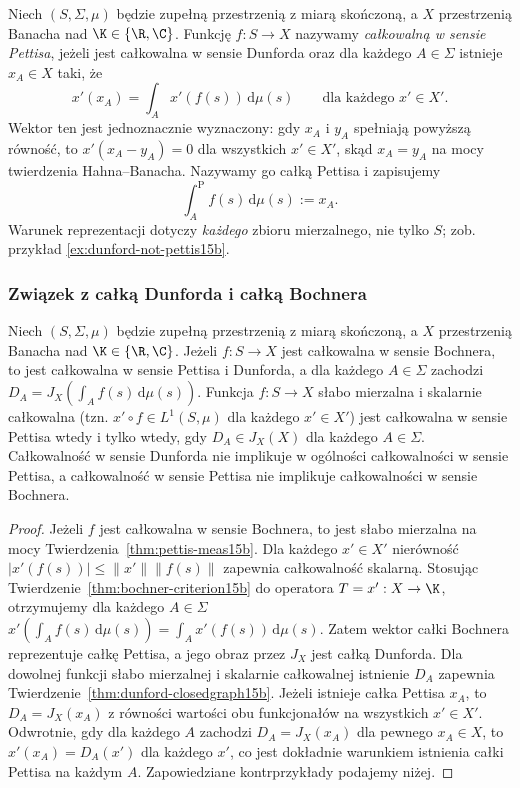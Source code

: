 \begin{definicja}
\label{def:pettis15b}
Niech $(S,\Sigma,\mu)$ będzie zupełną przestrzenią z miarą
skończoną, a $X$ przestrzenią Banacha nad $\K\in\{\R,\C\}$.
Funkcję $f:S\to X$ nazywamy \emph{całkowalną w sensie Pettisa},
jeżeli jest całkowalna w sensie Dunforda oraz
dla każdego $A\in\Sigma$ istnieje $x_A\in X$ taki, że
\[
 x'(x_A)=\int_A x'(f(s))\,\mathrm d\mu(s)
 \qquad\text{dla każdego }x'\in X'.
\]
Wektor ten jest jednoznacznie wyznaczony: gdy $x_A$ i $y_A$ spełniają
powyższą równość, to $x'(x_A-y_A)=0$ dla wszystkich $x'\in X'$,
skąd $x_A=y_A$ na mocy twierdzenia Hahna--Banacha.
Nazywamy go całką Pettisa i zapisujemy
\[
 \int_A^{\mathrm P} f(s)\,\mathrm d\mu(s):=x_A.
\]
Warunek reprezentacji dotyczy \emph{każdego} zbioru mierzalnego,
nie tylko $S$; zob. przykład \ref{ex:dunford-not-pettis15b}.
\end{definicja}

\subsubsection{Związek z całką Dunforda i całką Bochnera}

\begin{twierdzenie}
\label{thm:hierarchy-integrals15b}
Niech $(S,\Sigma,\mu)$ będzie zupełną przestrzenią z miarą
skończoną, a $X$ przestrzenią Banacha nad $\K\in\{\R,\C\}$.
Jeżeli $f:S\to X$ jest całkowalna w sensie Bochnera,
to jest całkowalna w sensie Pettisa i Dunforda, a dla
każdego $A\in\Sigma$ zachodzi
$D_A=J_X(\int_A f(s)\,\mathrm d\mu(s))$.
Funkcja $f:S\to X$ słabo mierzalna i skalarnie całkowalna
(tzn. $x'\circ f\in L^1(S,\mu)$ dla każdego $x'\in X'$) jest
całkowalna w sensie Pettisa wtedy i tylko wtedy, gdy
$D_A\in J_X(X)$ dla każdego $A\in\Sigma$.
Całkowalność w sensie Dunforda nie implikuje w ogólności
całkowalności w sensie Pettisa, a całkowalność w sensie
Pettisa nie implikuje całkowalności w sensie Bochnera.
\end{twierdzenie}
\begin{proof}
Jeżeli $f$ jest całkowalna w sensie Bochnera, to jest
słabo mierzalna na mocy Twierdzenia~\ref{thm:pettis-meas15b}.
Dla każdego $x'\in X'$ nierówność
$|x'(f(s))|\le\|x'\|\|f(s)\|$ zapewnia całkowalność skalarną.
Stosując Twierdzenie~\ref{thm:bochner-criterion15b}
do operatora $T=x':X\to\K$, otrzymujemy dla każdego
$A\in\Sigma$
$x'(\int_A f(s)\,\mathrm d\mu(s))=\int_Ax'(f(s))\,\mathrm d\mu(s)$.
Zatem wektor całki Bochnera reprezentuje całkę Pettisa,
a jego obraz przez $J_X$ jest całką Dunforda.
Dla dowolnej funkcji słabo mierzalnej i skalarnie całkowalnej
istnienie $D_A$ zapewnia Twierdzenie~\ref{thm:dunford-closedgraph15b}.
Jeżeli istnieje całka Pettisa $x_A$, to $D_A=J_X(x_A)$
z równości wartości obu funkcjonałów na wszystkich $x'\in X'$.
Odwrotnie, gdy dla każdego $A$ zachodzi $D_A=J_X(x_A)$
dla pewnego $x_A\in X$, to $x'(x_A)=D_A(x')$ dla każdego $x'$,
co jest dokładnie warunkiem istnienia całki Pettisa na każdym $A$.
Zapowiedziane kontrprzykłady podajemy niżej.
\end{proof}

